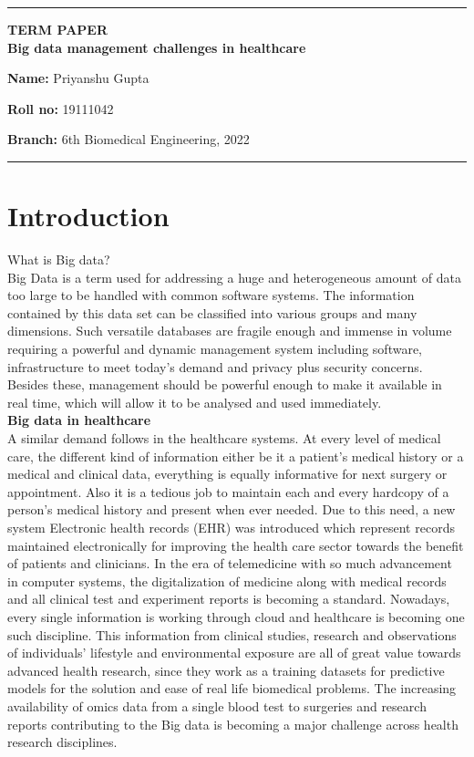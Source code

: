 \documentclass[10pt,a4paper,twoside]{article}
\begin{document}
\begin{center}
\hrule

\vspace{.4cm}
{\bf {\Large TERM PAPER  }}\\
\vspace{.3cm}
{\bf {\huge Big data management challenges in healthcare }}
\vspace{.3cm}
\end{center}

{\bf Name:}  Priyanshu Gupta

{\bf Roll no:}  19111042 

{\bf Branch: } 6th Biomedical Engineering, 2022 
\\
\hrule

\vspace{.3cm}
\section*{Introduction} 
What is Big data?\\
Big Data is a term used for addressing a huge and heterogeneous amount of data too large to be handled with common software systems. The information contained by this data set can be classified into various groups and many dimensions. Such versatile databases are fragile enough and immense in volume requiring a powerful and dynamic management system including software, infrastructure to meet today’s demand and privacy plus security concerns. Besides these, management should be powerful enough to make it available in real time, which will allow it to be analysed and used immediately. \\
 
\textbf{Big data in healthcare}\\
A similar demand follows in the healthcare systems. At every level of medical care, the different kind of information either be it a patient’s medical history or a medical and clinical data, everything is equally informative for next surgery or appointment. Also it is a tedious job to maintain each and every hardcopy of a person’s medical history and present when ever needed. Due to this need, a new system Electronic health records (EHR) was introduced which represent records maintained electronically for improving the health care sector towards the benefit of patients and clinicians. In the era of telemedicine with so much advancement in computer systems, the digitalization of medicine along with medical records and all clinical test and experiment reports is becoming a standard. Nowadays, every single information is working through cloud and healthcare is becoming one such discipline. This information from clinical studies, research and observations of individuals’ lifestyle and environmental exposure are all of great value towards advanced health research, since they work as a training datasets for predictive models for the solution and ease of real life biomedical problems. The increasing availability of omics data from a single blood test to surgeries and research reports contributing to the Big data is becoming a major challenge across health research disciplines.    \\
\end{document}
